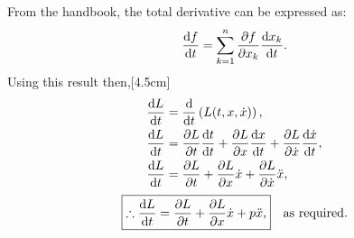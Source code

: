 From the handbook, the total derivative can be expressed as:
\[
	\deriv{f}{t} = \sum_{k=1}^n \pderiv{f}{x_k}\deriv{x_k}{t}.
\]
Using this result then,[4.5cm]
\begin{align*}
	\deriv{L}{t} &= \deriv{}{t}\lr{L(t,x,\dot{x})},\\
	\deriv{L}{t}& = \pderiv{L}{t}\deriv{t}{t} + \pderiv{L}{x}\deriv{x}{t} + \pderiv{L}{\dot{x}}\deriv{\dot{x}}{t},\\
	\deriv{L}{t}&= \pderiv{L}{t} + \pderiv{L}{x}\dot{x} + \pderiv{L}{\dot{x}}\ddot{x},
\end{align*}
\[
	\boxed{\therefore\deriv{L}{t}= \pderiv{L}{t} + \pderiv{L}{x}\dot{x} + p\ddot{x},}\quad\text{as required.}
\]
	
